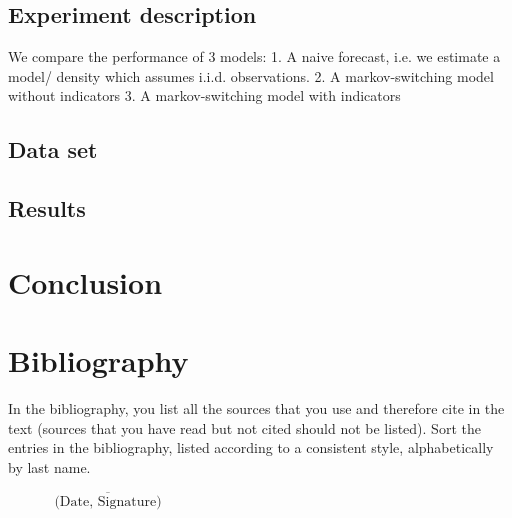 \documentclass[11pt,a4paper]{article}
\begin{document}
\subsection{Experiment description}
We compare the performance of 3 models: 
1. A naive forecast, i.e. we estimate a model/ density which assumes i.i.d. observations. 
2. A markov-switching model without indicators
3. A markov-switching model with indicators

\subsection{Data set}

\subsection{Results}

\section{Conclusion}


\newpage


\pagestyle{fancy}						
\fancyhf{}								
\fancyhead[R]{}							 
\renewcommand{\headrulewidth}{0pt}	 
\fancyfoot[R]{\thepage}				 
\renewcommand{\footrulewidth}{0pt}	 
\setcounter{page}{5}
\newpage\clearpage

\newpage
{}
\section*{Bibliography}
In the bibliography, you list all the sources that you use and therefore cite in the text (sources that you have read but not cited should not be listed). Sort the entries in the bibliography, listed according to a consistent style, alphabetically by last name.





\newpage

\begin{flushright}
$\overline{~~~~~~~~~~~~~~~\mbox{(Date, Signature)}~~~~~~~~~~~~~~~}$
\end{flushright}
\end{document}

